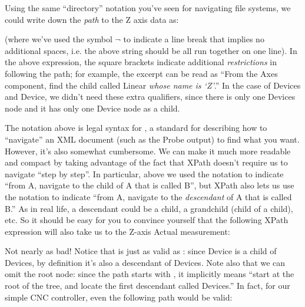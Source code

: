 Using the same ``directory'' notation you've seen for navigating file
systems, we could write down the \emph{path} to the Z axis data as:

\begin{quotation}
\end{quotation}

(where we've used the symbol $\neg$ to indicate a line break that
implies  no additional spaces, i.e. the above string should be all run
together on one line).  In the above expression, the square brackets
indicate additional \emph{restrictions} in following the path; for
example, the excerpt  can be read as
``From the Axes component, find the child called Linear \emph{whose name
  is `Z'}.''  In the case of Devices and Device, we didn't need these
extra qualifiers, since there is only one Devices node and it has only
one Device node as a child.

The notation above is legal syntax for , a standard for
describing how to ``navigate'' an XML document (such as the Probe
output) to find what you want.
However, it's also somewhat cumbersome.  We can make it much more
readable and compact by taking advantage of the fact that XPath doesn't
require us to navigate ``step by step''.  In particular, above
we used the notation  to indicate ``from A, navigate to the child
of A that is called B'', but XPath also lets us use the notation
 to indicate ``from A, navigate to the \emph{descendant} of
A that is called B.''  As in real life, a descendant could be a child, a
grandchild (child of a child), etc.  So it should be easy for you to
convince yourself that the following XPath expression will also take us
to the Z-axis Actual measurement:

\begin{quotation}
\end{quotation}

Not nearly as bad!  Notice that  is just as valid
as : since Device is a child of Devices, by
definition it's also a descendant of Devices.  Note also that we can
omit the root node:  since the path starts with , it
implicitly means ``start at the root of the tree, and locate the first
descendant called Devices.''  In fact, for our simple CNC controller,
even the following path would be valid:

